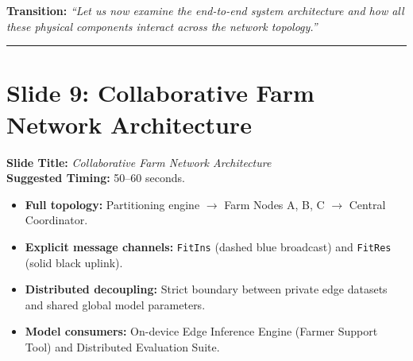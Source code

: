 \documentclass[11pt,a4paper]{article}
\begin{document}
\textbf{Transition:} \textit{``Let us now examine the end-to-end system architecture and how all these physical components interact across the network topology.''}

\vspace{0.35cm}\hrule\vspace{0.35cm}

\section{Slide 9: Collaborative Farm Network Architecture}
\textbf{Slide Title:} \textit{Collaborative Farm Network Architecture} \\
\textbf{Suggested Timing:} 50--60 seconds.

\begin{tcolorbox}[colframe=primaryblue, title=\textbf{Key Distributed Systems Points to Emphasize}]
\begin{itemize}[leftmargin=*]
    \item \textbf{Full topology:} Partitioning engine $\to$ Farm Nodes A, B, C $\to$ Central Coordinator.
    \item \textbf{Explicit message channels:} \texttt{FitIns} (dashed blue broadcast) and \texttt{FitRes} (solid black uplink).
    \item \textbf{Distributed decoupling:} Strict boundary between private edge datasets and shared global model parameters.
    \item \textbf{Model consumers:} On-device Edge Inference Engine (Farmer Support Tool) and Distributed Evaluation Suite.
\end{itemize}
\end{tcolorbox}
\end{document}
